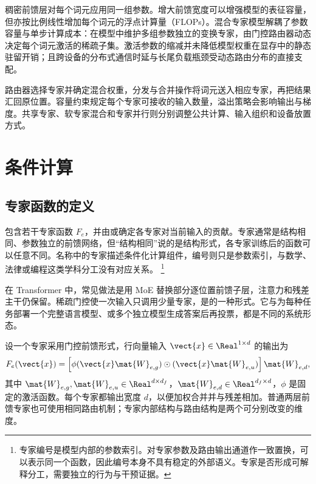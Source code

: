 \documentclass[../textbook.tex]{subfiles}
\begin{document}
\fi
{}

稠密前馈层对每个词元应用同一组参数。增大前馈宽度可以增强模型的表征容量，但亦按比例线性增加每个词元的浮点计算量（FLOPs）。混合专家模型解耦了参数容量与单步计算成本：在模型中维护多组参数独立的变换专家，由门控路由器动态决定每个词元激活的稀疏子集。激活参数的缩减并未降低模型权重在显存中的静态驻留开销；且跨设备的分布式通信时延与长尾负载瓶颈受动态路由分布的直接支配。

路由器选择专家并确定混合权重，分发与合并操作将词元送入相应专家，再把结果汇回原位置。容量约束规定每个专家可接收的输入数量，溢出策略会影响输出与梯度。共享专家、软专家混合和专家并行则分别调整公共计算、输入组织和设备放置方式。

\section{条件计算}

\subsection{专家函数的定义}
包含若干专家函数 $F_e$，并由或确定各专家对当前输入的贡献。专家通常是结构相同、参数独立的前馈网络，但“结构相同”说的是结构形式，各专家训练后的函数可以任意不同。名称中的专家描述条件化计算组件，编号则只是参数索引，与数学、法律或编程这类学科分工没有对应关系。
\footnote{专家编号是模型内部的参数索引。对专家参数及路由输出通道作一致置换，可以表示同一个函数，因此编号本身不具有稳定的外部语义。专家是否形成可解释分工，需要独立的行为与干预证据。}

在 Transformer 中，常见做法是用 MoE 替换部分逐位置前馈子层，注意力和残差主干仍保留。稀疏门控使一次输入只调用少量专家，是的一种形式\cite{shazeer2017sparsemoe}。它与为每种任务部署一个完整语言模型、或多个独立模型生成答案后再投票，都是不同的系统形态。

设一个专家采用门控前馈形式，行向量输入 $\vect{x}\in\Real^{1\times d}$ 的输出为
\begin{equation}
 F_e(\vect{x})=\left[\phi(\vect{x}\mat{W}_{e,g})\odot(\vect{x}\mat{W}_{e,u})\right]\mat{W}_{e,d},
\end{equation}
其中 $\mat{W}_{e,g},\mat{W}_{e,u}\in\Real^{d\times d_f}$，$\mat{W}_{e,d}\in\Real^{d_f\times d}$，$\phi$ 是固定的激活函数。每个专家都输出宽度 $d$，以便加权合并并与残差相加。普通两层前馈专家也可使用相同路由机制；专家内部结构与路由结构是两个可分别改变的维度。
\end{document}
